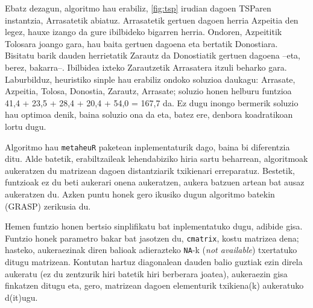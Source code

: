 \documentclass[eu]{ifirak}\usepackage[]{graphicx}\usepackage[]{color}
\newcommand{\code}[1]{\texttt{#1}}
\begin{document}
Ebatz dezagun, algoritmo hau erabiliz, \ref{fig:tsp} irudian dagoen TSParen instantzia, Arrasatetik abiatuz. Arrasatetik gertuen dagoen herria Azpeitia den legez, hauxe izango da gure ibilbideko bigarren herria. Ondoren, Azpeititik Tolosara joango gara, hau baita gertuen dagoena eta  bertatik Donostiara. Bisitatu barik dauden herrietatik Zarautz da Donostiatik gertuen dagoena --eta, berez, bakarra--. Ibilbidea ixteko Zarautzetik Arrasatera itzuli beharko gara. Laburbilduz, heuristiko sinple hau erabiliz ondoko soluzioa daukagu: Arrasate, Azpeitia, Tolosa, Donostia, Zarautz, Arrasate; soluzio honen helburu funtzioa 41,4 + 23,5 + 28,4 + 20,4 + 54,0 = 167,7 da. Ez dugu inongo bermerik soluzio hau optimoa denik, baina soluzio ona da eta, batez ere, denbora koadratikoan lortu dugu.
%
%



Algoritmo hau \code{metaheuR} paketean inplementaturik dago, baina bi diferentzia ditu. Alde batetik, erabiltzaileak lehendabiziko hiria sartu beharrean, algoritmoak aukeratzen du matrizean dagoen distantziarik txikienari erreparatuz. Bestetik, funtzioak ez du beti aukerari onena aukeratzen, aukera batzuen artean bat ausaz aukeratzen du. Azken puntu honek gero ikusiko dugun algoritmo batekin (GRASP) zerikusia du. 

Hemen funtzio honen bertsio sinplifikatu bat inplementatuko dugu, adibide gisa. Funtzio honek parametro bakar bat jasotzen du, \code{cmatrix}, kostu matrizea dena; hasteko, aukeraezinak diren balioak adierazteko \code{NA}-k (\textit{not available}) txertatuko ditugu matrizean. Kontutan hartuz diagonalean dauden balio guztiak ezin direla aukeratu (ez du zentzurik hiri batetik hiri berberara joatea), aukeraezin gisa finkatzen ditugu eta, gero, matrizean dagoen elementurik txikiena(k) aukeratuko d(it)ugu.
\end{document}
